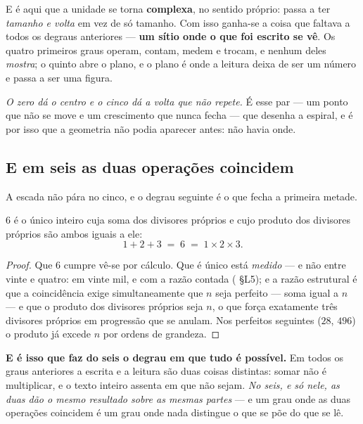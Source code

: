 \documentclass[livro.tex]{subfiles}
\begin{document}
\medskip
\noindent E é aqui que a unidade se torna \textbf{complexa}, no sentido próprio: passa a ter
\emph{tamanho e volta} em vez de só tamanho. Com isso ganha-se a coisa que faltava a todos os
degraus anteriores --- \textbf{um sítio onde o que foi escrito se vê}. Os quatro primeiros graus
operam, contam, medem e trocam, e nenhum deles \emph{mostra}; o quinto abre o plano, e o plano é
onde a leitura deixa de ser um número e passa a ser uma figura.

\medskip
\noindent \emph{O zero dá o centro e o cinco dá a volta que não repete.} É esse par --- um ponto
que não se move e um crescimento que nunca fecha --- que desenha a espiral, e é por isso que a
geometria não podia aparecer antes: não havia onde.

\subsection{E em seis as duas operações coincidem}\label{sec:seis}

\noindent A escada não pára no cinco, e o degrau seguinte é o que fecha a primeira metade.

\begin{teorema}\label{thm:seis}
$6$ é o único inteiro cuja soma dos divisores próprios e cujo produto dos divisores próprios são
ambos iguais a ele:
\[
  1+2+3 \;=\; 6 \;=\; 1\times2\times3 .
\]
\end{teorema}

\begin{proof}
Que $6$ cumpre vê-se por cálculo. Que é único está \emph{medido} --- e não entre vinte e quatro: em vinte mil, e com a razão contada ( \S L5); e a
razão estrutural é que a coincidência exige simultaneamente que $n$ seja perfeito --- soma igual a
$n$ --- e que o produto dos divisores próprios seja $n$, o que força exatamente três divisores
próprios em progressão que se anulam. Nos perfeitos seguintes ($28$, $496$) o produto já excede
$n$ por ordens de grandeza.
\end{proof}

\noindent \textbf{E é isso que faz do seis o degrau em que tudo é possível.} Em todos os graus
anteriores a escrita e a leitura são duas coisas distintas: somar não é multiplicar, e o texto
inteiro assenta em que não sejam. \emph{No seis, e só nele, as duas dão o mesmo resultado sobre as
mesmas partes} --- e um grau onde as duas operações coincidem é um grau onde nada distingue o que
se põe do que se lê.
\end{document}
